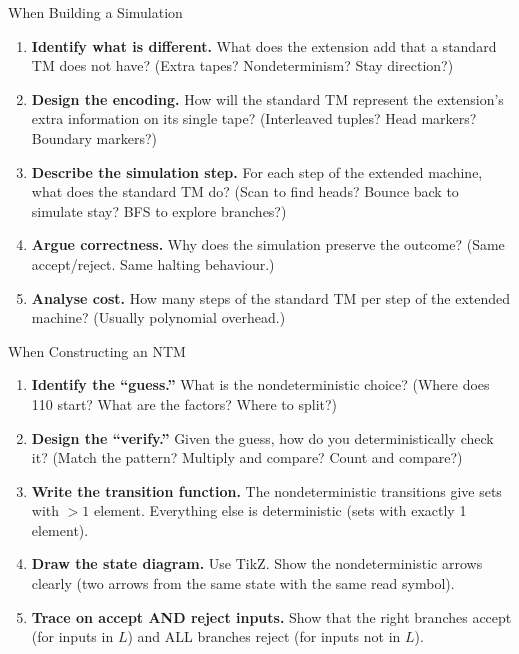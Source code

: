 \documentclass[11pt,a4paper]{article}
\begin{document}
\begin{notebox}{When Building a Simulation}
\begin{enumerate}[nosep]
\item \textbf{Identify what is different.} What does the extension add that a standard TM does not have? (Extra tapes? Nondeterminism? Stay direction?)
\item \textbf{Design the encoding.} How will the standard TM represent the extension's extra information on its single tape? (Interleaved tuples? Head markers? Boundary markers?)
\item \textbf{Describe the simulation step.} For each step of the extended machine, what does the standard TM do? (Scan to find heads? Bounce back to simulate stay? BFS to explore branches?)
\item \textbf{Argue correctness.} Why does the simulation preserve the outcome? (Same accept/reject. Same halting behaviour.)
\item \textbf{Analyse cost.} How many steps of the standard TM per step of the extended machine? (Usually polynomial overhead.)
\end{enumerate}
\end{notebox}

\begin{notebox}{When Constructing an NTM}
\begin{enumerate}[nosep]
\item \textbf{Identify the ``guess.''} What is the nondeterministic choice? (Where does 110 start? What are the factors? Where to split?)
\item \textbf{Design the ``verify.''} Given the guess, how do you deterministically check it? (Match the pattern? Multiply and compare? Count and compare?)
\item \textbf{Write the transition function.} The nondeterministic transitions give sets with $>1$ element. Everything else is deterministic (sets with exactly 1 element).
\item \textbf{Draw the state diagram.} Use TikZ. Show the nondeterministic arrows clearly (two arrows from the same state with the same read symbol).
\item \textbf{Trace on accept AND reject inputs.} Show that the right branches accept (for inputs in $L$) and ALL branches reject (for inputs not in $L$).
\end{enumerate}
\end{notebox}

\end{document}
